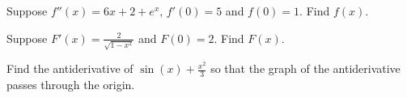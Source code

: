 \documentclass[../main.tex]{subfiles}
\begin{document}
\begin{example}
  Suppose \(f''(x) = 6x + 2 + e^{x}\), \(f'(0) = 5\) and \(f(0) = 1\). Find \(f(x)\).

  \blanks*
\end{example}
\clearpage

%
%

\begin{exercise}
  Suppose \(F'(x) = \frac{2}{\sqrt{1 - x^{2}}}\) and \(F(0) = 2\).  Find \(F(x)\).

  \blanks*
\end{exercise}

\begin{exercise}
  Find the antiderivative of \(\sin(x) + \frac{x^{2}}{3}\) so that the graph of the antiderivative passes through the origin.

  \blanks*
\end{exercise}
\end{document}
